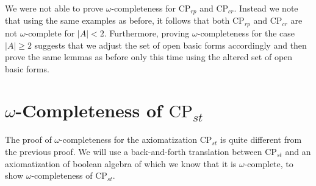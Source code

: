 \documentclass[a4paper,twoside,openright]{report}
\begin{document}
We were not able to prove $\omega$-completeness for $\text{CP}_{rp}$ and $\text{CP}_{cr}$. Instead we note that using the same examples as before, it follows that both $\text{CP}_{rp}$ and $\text{CP}_{cr}$ are not $\omega$-complete for $|A|<2$. Furthermore, proving $\omega$-completeness for the case $|A|\ge 2$ suggests that we adjust the set of open basic forms accordingly and then prove the same lemmas as before only this time using the altered set of open basic forms. 

\section{$\omega$-Completeness of $\text{CP}_{st}$}

The proof of $\omega$-completeness for the axiomatization $\text{CP}_{st}$ is quite different from the previous proof. We will use a back-and-forth translation between $\text{CP}_{st}$ and an axiomatization of boolean algebra of which we know that it is $\omega$-complete, to show $\omega$-completeness of $\text{CP}_{st}$.
\end{document}

